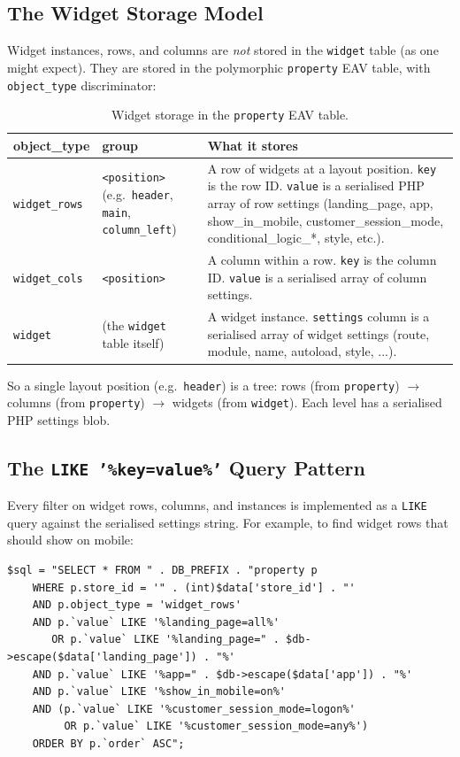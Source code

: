 \documentclass[11pt,a4paper]{article}
\begin{document}
\subsection{The Widget Storage Model}

Widget instances, rows, and columns are \emph{not} stored in the
\texttt{widget} table (as one might expect). They are stored in
the polymorphic \texttt{property} EAV table, with
\texttt{object\_type} discriminator:

\begin{table}[htbp]
\centering
\caption{Widget storage in the \texttt{property} EAV table.}\label{tab:widget-storage}
\small
\begin{tabularx}{\columnwidth}{llX}
\toprule
\textbf{object\_type} & \textbf{group} & \textbf{What it stores} \\
\midrule
\texttt{widget\_rows} & \texttt{<position>} (e.g.\ \texttt{header}, \texttt{main}, \texttt{column\_left}) & A row of widgets at a layout position. \texttt{key} is the row ID. \texttt{value} is a serialised PHP array of row settings (landing\_page, app, show\_in\_mobile, customer\_session\_mode, conditional\_logic\_*, style, etc.). \\
\texttt{widget\_cols} & \texttt{<position>} & A column within a row. \texttt{key} is the column ID. \texttt{value} is a serialised array of column settings. \\
\texttt{widget}       & (the \texttt{widget} table itself) & A widget instance. \texttt{settings} column is a serialised array of widget settings (route, module, name, autoload, style, ...). \\
\bottomrule
\end{tabularx}
\end{table}

So a single layout position (e.g.\ \texttt{header}) is a tree:
rows (from \texttt{property}) $\to$ columns (from \texttt{property})
$\to$ widgets (from \texttt{widget}). Each level has a serialised
PHP settings blob.

\subsection{The \texttt{LIKE '\%key=value\%'} Query Pattern}

Every filter on widget rows, columns, and instances is implemented
as a \texttt{LIKE} query against the serialised settings string.
For example, to find widget rows that should show on mobile:

\begin{lstlisting}[caption={The \texttt{LIKE '\%key=value\%'} pattern in \texttt{NecoWidget::getRows()}.},label={lst:like-pattern}]
$sql = "SELECT * FROM " . DB_PREFIX . "property p
    WHERE p.store_id = '" . (int)$data['store_id'] . "'
    AND p.object_type = 'widget_rows'
    AND p.`value` LIKE '%landing_page=all%'
       OR p.`value` LIKE '%landing_page=" . $db->escape($data['landing_page']) . "%'
    AND p.`value` LIKE '%app=" . $db->escape($data['app']) . "%'
    AND p.`value` LIKE '%show_in_mobile=on%'
    AND (p.`value` LIKE '%customer_session_mode=logon%'
         OR p.`value` LIKE '%customer_session_mode=any%')
    ORDER BY p.`order` ASC";
\end{lstlisting}
\end{document}
